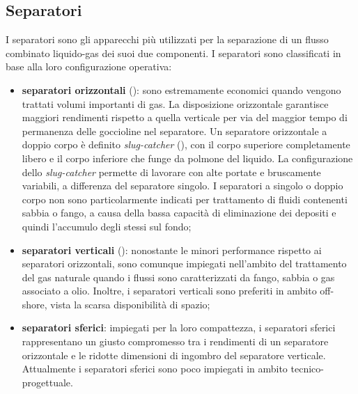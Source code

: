\subsection{Separatori} %
I separatori sono gli apparecchi più utilizzati per la separazione di un flusso combinato liquido-gas dei suoi due componenti. I separatori sono classificati in base alla loro configurazione operativa:
\begin{itemize}
    \item \textbf{separatori orizzontali} (): sono estremamente economici quando vengono trattati volumi importanti di gas. La disposizione orizzontale garantisce maggiori rendimenti rispetto a quella verticale per via del maggior tempo di permanenza delle goccioline nel separatore. Un separatore orizzontale a doppio corpo è definito \textit{slug-catcher} (), con il corpo superiore completamente libero e il corpo inferiore che funge da polmone del liquido. La configurazione dello \textit{slug-catcher} permette di lavorare con alte portate e bruscamente variabili, a differenza del separatore singolo. I separatori a singolo o doppio corpo non sono particolarmente indicati per trattamento di fluidi contenenti sabbia o fango, a causa della bassa capacità di eliminazione dei depositi e quindi l'accumulo degli stessi sul fondo;
    \item \textbf{separatori verticali} (): nonostante le minori performance rispetto ai separatori orizzontali, sono comunque impiegati nell'ambito del trattamento del gas naturale quando i flussi sono caratterizzati da fango, sabbia o gas associato a olio. Inoltre, i separatori verticali sono preferiti in ambito off-shore, vista la scarsa disponibilità di spazio;
    \item \textbf{separatori sferici}: impiegati per la loro compattezza, i separatori sferici rappresentano un giusto compromesso tra i rendimenti di un separatore orizzontale e le ridotte dimensioni di ingombro del separatore verticale. Attualmente i separatori sferici sono poco impiegati in ambito tecnico-progettuale.
\end{itemize}

